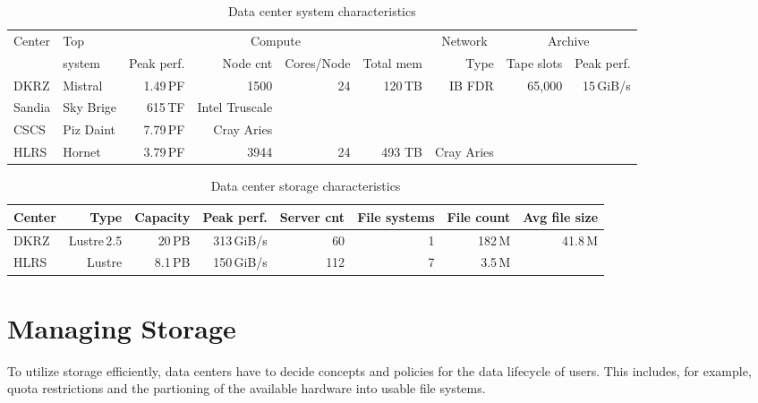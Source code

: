 \documentclass{superfri}
\numberwithin{equation}{section}
\begin{document}
\begin{table}[bt]
\renewcommand{\arraystretch}{0.9}
\renewcommand{\tabcolsep}{0.1cm}
\begin{tabular}[c]{ll|r|r|r|r||r||r|r}
Center & Top    & \multicolumn{4}{c||}{Compute}      & \multicolumn{1}{c||}{Network}               & \multicolumn{2}{c}{Archive} \\
 & system & Peak perf. & Node cnt & Cores/Node & Total mem & Type                 & Tape slots & Peak perf. \\ \hline
 \hline

DKRZ & Mistral & 1.49\,PF   & 1500       & 24         & 120\,TB  & IB FDR     & 65,000 & 15\,GiB/s \\ \hline
Sandia & Sky Brige & 615\,TF   & Intel Truscale \\ \hline
CSCS & Piz Daint & 7.79\,PF & Cray Aries \\ \hline
HLRS & Hornet & 3.79\,PF & 3944 & 24 & 493 TB & Cray Aries &   \\ \hline

\end{tabular}
\caption{Data center system characteristics\label{tbl:overviewCharacteristics}}
\end{table}

\begin{table}[bt]
\renewcommand{\arraystretch}{0.9}
\renewcommand{\tabcolsep}{0.1cm}
\begin{tabular}[c]{l|r|r|r|r|r|r|r}
Center & Type        & Capacity  & Peak perf.     & Server cnt & File systems & File count    & Avg file size    \\ \hline
DKRZ   & Lustre\,2.5 & 20\,PB    & 313\,GiB/s     & 60         & 1            & 182\,M        & 41.8\,M           \\ \hline
HLRS   & Lustre  & 8.1\,PB       & 150\,GiB/s     & 112        & 7            & 3.5\,M        & 

\end{tabular}
\caption{Data center storage characteristics\label{tbl:overviewIO}}
\end{table}

\section{Managing Storage}

To utilize storage efficiently, data centers have to decide concepts and policies for the data lifecycle of users.
This includes, for example, quota restrictions and the partioning of the available hardware into usable file systems.
\end{document}
